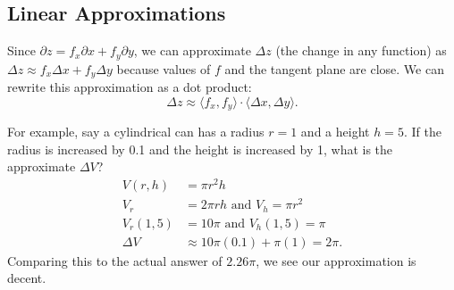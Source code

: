 \subsection{Linear Approximations}
\noindent
Since $\partial z = f_x\partial x + f_y\partial y$, we can approximate $\Delta z$ (the change in any function) as $\Delta z \approx f_x\Delta x + f_y\Delta y$ because values of $f$ and the tangent plane are close.
We can rewrite this approximation as a dot product:
\begin{equation*}
	\Delta z \approx \langle f_x, f_y\rangle \cdot \langle \Delta x, \Delta y \rangle.
\end{equation*}

For example, say a cylindrical can has a radius $r=1$ and a height $h=5$. If the radius is increased by 0.1 and the height is increased by 1, what is the approximate $\Delta V$?
\begin{align*}
	V(r,h) &= \pi r^2 h \\
	V_r &= 2\pi rh \text{ and } V_h = \pi r^2 \\
	V_{r}(1,5) &= 10\pi  \text{ and } V_{h}(1,5) = \pi \\
	\Delta V &\approx 10\pi(0.1) + \pi(1) = 2\pi.
\end{align*}
Comparing this to the actual answer of $2.26\pi$, we see our approximation is decent.